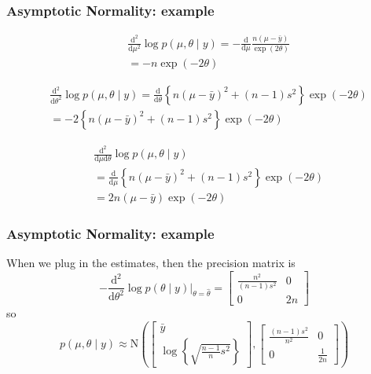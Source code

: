 \documentclass{beamer}
\begin{document}
\begin{frame}
\frametitle{Asymptotic Normality: example}

\begin{align*}
&\frac{\text{d}^2}{\text{d} \mu^2} \log p(\mu, \theta \mid y) = - \frac{\text{d}}{\text{d} \mu}  \frac{n(\mu - \bar{y})}{ \exp(2\theta) }  \\
&= - n \exp(-2\theta)
\end{align*}

\begin{align*}
& \frac{\text{d}^2}{\text{d} \theta^2} \log p(\mu, \theta \mid y) =  \frac{\text{d}}{\text{d} \theta} \left\{ n(\mu - \bar{y})^2 + (n-1)s^2 \right\} \exp(-2\theta) \\
&=  -2 \left\{ n(\mu - \bar{y})^2 + (n-1)s^2 \right\} \exp(-2\theta) 
\end{align*}

\begin{align*}
& \frac{\text{d}^2}{\text{d} \mu \text{d} \theta} \log p(\mu, \theta \mid y) \\
&=  \frac{\text{d}}{\text{d} \mu} \left\{ n(\mu - \bar{y})^2 + (n-1)s^2 \right\} \exp(-2\theta) \\
&=  2 n(\mu - \bar{y})\exp(-2\theta) 
\end{align*}


\end{frame}

\begin{frame}
\frametitle{Asymptotic Normality: example}

When we plug in the estimates, then the precision matrix is
$$
-\frac{\text{d}^2}{\text{d}\theta^2} \log p(\theta \mid y) \bigg|_{\theta = \hat{\theta}} = 
\left[ \begin{array}{cc}
\frac{n^2}{(n-1)s^2} & 0 \\
0 & 2n
\end{array}\right]
$$
so
$$
p(\mu, \theta \mid y) \approx \text{N}\left(
\left[\begin{array}{c}
\bar{y}\\
\log \left\{ \sqrt{ \frac{n-1}{n}s^2}  \right\}
\end{array}\right],
\left[ \begin{array}{cc}
\frac{(n-1)s^2}{n^2} & 0 \\
0 & \frac{1}{2n}
\end{array}\right]
\right)
$$
\end{frame}
\end{document}
